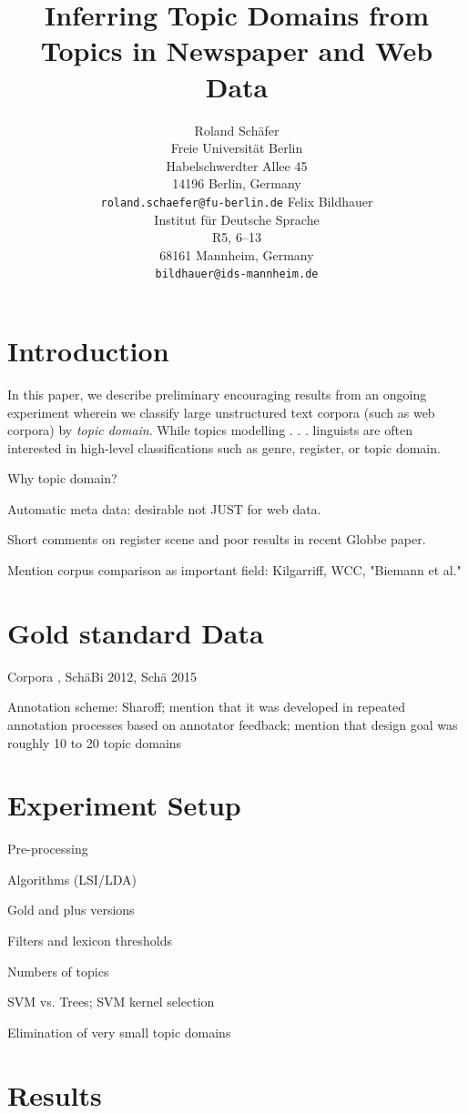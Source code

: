 \documentclass[11pt]{article}
\title{Inferring Topic Domains from Topics in Newspaper and Web Data}
\author{Roland Schäfer\\
	    Freie Universität Berlin\\
	    Habelschwerdter Allee 45\\
	    14196 Berlin, Germany\\
	    {\tt roland.schaefer@fu-berlin.de}
	  \And
	Felix Bildhauer\\
  	Institut für Deutsche Sprache\\
  	R5, 6--13\\
  	68161 Mannheim, Germany\\
  {\tt bildhauer@ids-mannheim.de}}
\date{}
\begin{document}
\maketitle

\begin{abstract}
\end{abstract}

\section{Introduction}

In this paper, we describe preliminary encouraging results from an ongoing experiment wherein we classify large unstructured text corpora (such as web corpora) by \textit{topic domain}.
While topics modelling . . . linguists are often interested in high-level classifications such as genre, register, or topic domain.


Why topic domain?

Automatic meta data: desirable not JUST for web data.

Short comments on register scene and poor results in recent Globbe paper.

Mention corpus comparison as important field: Kilgarriff, WCC, "Biemann et al."

\section{Gold standard Data}

Corpora \cite{KupietzEa2010}, SchäBi 2012, Schä 2015

Annotation scheme: Sharoff; mention that it was developed in repeated annotation processes based on annotator feedback; mention that design goal was roughly 10 to 20 topic domains

\section{Experiment Setup}

Pre-processing

Algorithms (LSI/LDA)

Gold and plus versions

Filters and lexicon thresholds

Numbers of topics

SVM vs. Trees; SVM kernel selection

Elimination of very small topic domains

\section{Results}
\end{document}
